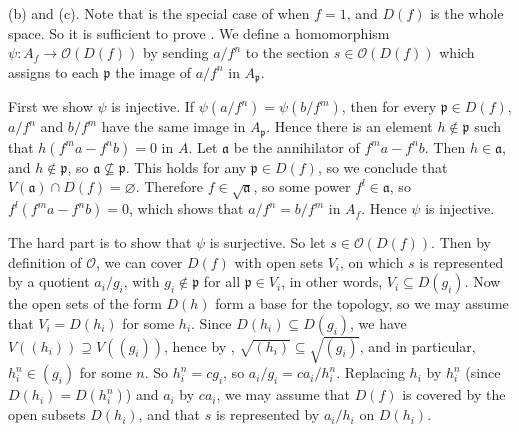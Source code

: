 {(b) and (c). Note that  is the special case of  when $f=1$, and $D(f)$ is the whole space. So it is sufficient to prove . We define a homomorphism $\psi\colon A_f\to\mathcal O(D(f))$ by sending $a/f^n$ to the section $s\in\mathcal O(D(f))$ which assigns to each $\mathfrak p$ the image of $a/f^n$ in $A_{\mathfrak p}$.

First we show $\psi$ is injective. If $\psi(a/f^n)=\psi(b/f^m)$, then for every $\mathfrak p\in D(f)$, $a/f^n$ and $b/f^m$ have the same image in $A_{\mathfrak p}$. Hence there is an element $h\notin\mathfrak p$ such that $h(f^ma-f^nb)=0$ in $A$. Let $\mathfrak a$ be the annihilator of $f^ma-f^nb$. Then $h\in\mathfrak a$, and $h\notin\mathfrak p$, so $\mathfrak a\nsubseteq\mathfrak p$. This holds for any $\mathfrak p\in D(f)$, so we conclude that $V(\mathfrak a)\cap D(f)=\varnothing$. Therefore $f\in\sqrt{\mathfrak a}$, so some power $f^l\in\mathfrak a$, so $f^l(f^ma-f^nb)=0$, which shows that $a/f^n=b/f^m$ in $A_f$. Hence $\psi$ is injective.

The hard part is to show that $\psi$ is surjective. So let $s\in\mathcal O(D(f))$. Then by definition of $\mathcal O$, we can cover $D(f)$ with open sets $V_i$, on which $s$ is represented by a quotient $a_i/g_i$, with $g_i\notin\mathfrak p$ for all $\mathfrak p\in V_i$, in other words, $V_i\subseteq D(g_i)$. Now the open sets of the form $D(h)$ form a base for the topology, so we may assume that $V_i=D(h_i)$ for some $h_i$. Since $D(h_i)\subseteq D(g_i)$, we have $V((h_i))\supseteq V((g_i))$, hence by , $\sqrt{(h_i)}\subseteq\sqrt{(g_i)}$, and in particular, $h_i^n\in(g_i)$ for some $n$. So $h_i^n=cg_i$, so $a_i/g_i=ca_i/h_i^n$. Replacing $h_i$ by $h_i^n$ (since $D(h_i)=D(h_i^n)$) and $a_i$ by $ca_i$, we may assume that $D(f)$ is covered by the open subsets $D(h_i)$, and that $s$ is represented by $a_i/h_i$ on $D(h_i)$.
}
